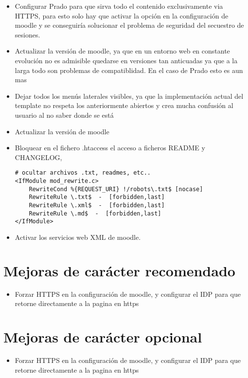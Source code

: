 \begin{itemize}
	\item Configurar Prado para que sirva todo el contenido exclusivamente via HTTPS, para esto solo hay que activar la opción en la configuración de moodle y se conseguiría solucionar el problema de seguridad del secuestro de sesiones.


	\item Actualizar la versión de moodle, ya que en un entorno web en constante evolución no es admisible quedarse en versiones tan anticuadas ya que a la larga todo son problemas de compatiblidad. En el caso de Prado esto es aun mas


	
	


	\item Dejar todos los menús laterales visibles, ya que la implementación actual del template no respeta los anteriormente abiertos y crea mucha confusión al usuario al no saber donde se está
	
	\item Actualizar la versión de moodle 
	
	\item Bloquear en el fichero .htaccess el acceso a ficheros README y CHANGELOG,


\begin{lstlisting}
# ocultar archivos .txt, readmes, etc..
<IfModule mod_rewrite.c>
    RewriteCond %{REQUEST_URI} !/robots\.txt$ [nocase]
    RewriteRule \.txt$  -  [forbidden,last]
    RewriteRule \.xml$  -  [forbidden,last]
    RewriteRule \.md$  -  [forbidden,last]
</IfModule>
\end{lstlisting}	


	\item Activar los servicios web XML de moodle.
	
\end{itemize}


\section{Mejoras de carácter recomendado}

\begin{itemize}
	\item Forzar HTTPS en la configuración de moodle, y configurar el IDP para que retorne directamente a la pagina en https
	
\end{itemize}

\section{Mejoras de carácter opcional}
\begin{itemize}
	\item Forzar HTTPS en la configuración de moodle, y configurar el IDP para que retorne directamente a la pagina en https
	
\end{itemize}

